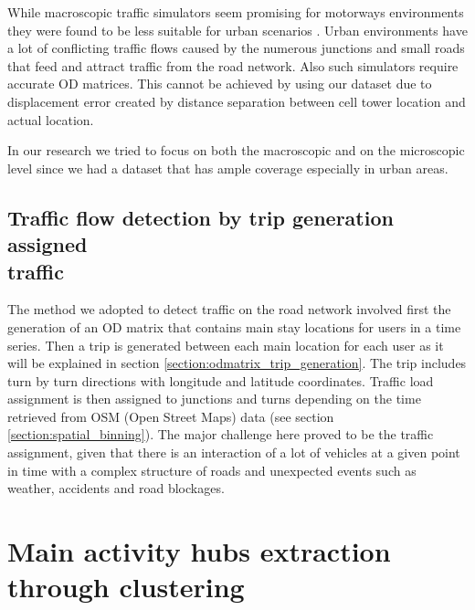 \documentclass[12pt, a4paper]{report}
\theoremstyle{definition}
\theoremstyle{definition}%
\theoremstyle{definition}%
\theoremstyle{definition}%
\theoremstyle{definition}%
\theoremstyle{definition}%
\begin{document}
While macroscopic traffic simulators seem promising for motorways environments they were found to be less suitable for urban scenarios \cite{Bazghandi2012}. Urban environments have a lot of conflicting traffic flows caused by the numerous junctions and small roads that feed and attract traffic from the road network. Also such simulators require accurate OD matrices. This cannot be achieved by using our dataset due to displacement error created by distance separation between cell tower location and actual location.

In our research we tried to focus on both the macroscopic and on the microscopic level since we had a dataset that has ample coverage especially in urban areas.    


\subsection{Traffic flow detection by trip generation assigned\\ traffic} \label{subsection:methodology:trip_generation}
The method we adopted to detect traffic on the road network involved first the generation of an OD matrix that contains main stay locations for users in a time series. Then a trip is generated between each main location for each user as it will be explained in section \ref{section:odmatrix_trip_generation}. The trip includes turn by turn directions with longitude and latitude coordinates. Traffic load assignment is then assigned to junctions and turns depending on the time retrieved from OSM (Open Street Maps) data (see section \ref{section:spatial_binning}). The major challenge here proved to be the traffic assignment, given that there is an interaction of a lot of vehicles at a given point in time with a complex structure of roads and unexpected events such as weather, accidents and road blockages. 


\section{Main activity hubs extraction through clustering} \label{section:methodology:clustering}
\end{document}
